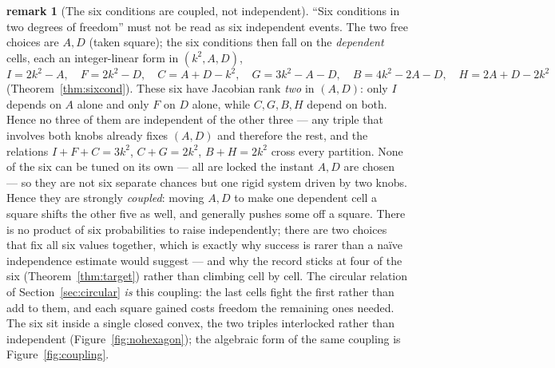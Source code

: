 \documentclass[11pt]{article}
\theoremstyle{definition}
\newtheorem{remark}{remark}
\begin{document}
\begin{remark}[The six conditions are coupled, not independent]\label{rem:coupled}
``Six conditions in two degrees of freedom'' must not be read as six independent events.
The two free choices are $A,D$ (taken square); the six conditions then fall on the
\emph{dependent} cells, each an integer-linear form in $(k^2,A,D)$,
\[
  I=2k^2-A,\quad F=2k^2-D,\quad C=A+D-k^2,\quad G=3k^2-A-D,\quad
  B=4k^2-2A-D,\quad H=2A+D-2k^2
\]
(Theorem~\ref{thm:sixcond}). These six have Jacobian rank \emph{two} in $(A,D)$: only $I$
depends on $A$ alone and only $F$ on $D$ alone, while $C,G,B,H$ depend on both. Hence no
three of them are independent of the other three --- any triple that involves both knobs
already fixes $(A,D)$ and therefore the rest, and the relations $I+F+C=3k^2$, $C+G=2k^2$,
$B+H=2k^2$ cross every partition. None of the six can be tuned on its own --- all are locked the
instant $A,D$ are chosen --- so they are not six separate chances but one rigid system
driven by two knobs. Hence they are strongly \emph{coupled}: moving $A,D$ to make one
dependent cell a square shifts the other five as well, and generally pushes some off a
square. There is no product of six probabilities to raise independently; there are two
choices that fix all six values together, which is exactly why success is rarer than a
na\"ive independence estimate would suggest --- and why the record sticks at four of the
six (Theorem~\ref{thm:target}) rather than climbing cell by cell. The circular relation of
Section~\ref{sec:circular} \emph{is} this coupling: the last cells fight the first rather
than add to them, and each square gained costs freedom the remaining ones needed. The six
sit inside a single closed convex, the two triples interlocked rather than independent
(Figure~\ref{fig:nohexagon}); the algebraic form of the same coupling is
Figure~\ref{fig:coupling}.
\end{remark}
\end{document}
